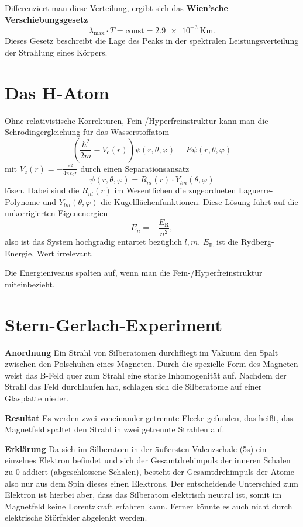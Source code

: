 Differenziert man diese Verteilung, ergibt sich das \textbf{Wien'sche Verschiebungsgesetz}
\begin{equation*}
	\lambda_\text{max}\cdot T = \text{const} = \SI{2.9e-3}{\kelvin\meter}.
\end{equation*}
Dieses Gesetz beschreibt die Lage des Peaks in der spektralen Leistungsverteilung der Strahlung eines Körpers.

\section{Das H-Atom}
Ohne relativistische Korrekturen, Fein-/Hyperfreinstruktur kann man die Schrödingergleichung für das Wasserstoffatom
\begin{equation*}
	\left(\frac{\hbar^2}{2m}-V_\text{c}(r)\right)\psi(r,\theta,\varphi) = E\psi(r,\theta,\varphi)
\end{equation*}
mit $V_\text{c}(r)=-\frac{e^2}{4\pi\varepsilon_0r}$ durch einen Separationsansatz
\begin{equation*}
	\psi(r,\theta,\varphi) = R_{nl}(r)\cdot Y_{lm}(\theta,\varphi)
\end{equation*}
lösen.
Dabei sind die $R_{nl}(r)$ im Wesentlichen die zugeordneten Laguerre-Polynome und $Y_{lm}(\theta,\varphi)$ die Kugelflächenfunktionen.
Diese Lösung führt auf die unkorrigierten Eigenenergien
\begin{equation*}
	E_n = -\frac{E_\text{R}}{n^2},
\end{equation*}
also ist das System hochgradig entartet bezüglich $l,m$.
$E_\text{R}$ ist die Rydberg-Energie, Wert irrelevant.

Die Energieniveaus spalten auf, wenn man die Fein-/Hyperfreinstruktur miteinbezieht.

\section{Stern-Gerlach-Experiment}
\textbf{Anordnung}  Ein Strahl von Silberatomen durchfliegt im Vakuum den Spalt zwischen den Polschuhen eines Magneten.
Durch die spezielle Form des Magneten weist das B-Feld quer zum Strahl eine starke Inhomogenität auf.
Nachdem der Strahl das Feld durchlaufen hat, schlagen sich die Silberatome auf einer Glasplatte nieder.

\textbf{Resultat}  Es werden zwei voneinander getrennte Flecke gefunden, das heißt, das Magnetfeld spaltet den Strahl in zwei getrennte Strahlen auf.

\textbf{Erklärung}  Da sich im Silberatom in der äußersten Valenzschale (5s) ein einzelnes Elektron befindet und sich der Gesamtdrehimpuls der inneren Schalen zu 0 addiert (abgeschlossene Schalen), besteht der Gesamtdrehimpuls der Atome also nur aus dem Spin dieses einen Elektrons.
Der entscheidende Unterschied zum Elektron ist hierbei aber, dass das Silberatom elektrisch neutral ist, somit im Magnetfeld keine Lorentzkraft erfahren kann.
Ferner könnte es auch nicht durch elektrische Störfelder abgelenkt werden.

